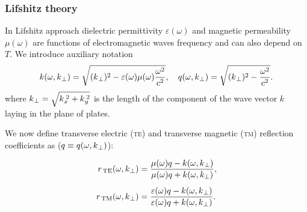 \documentclass[10pt,t]{beamer}
\begin{document}
\begin{frame}
  \frametitle{Lifshitz theory}


  In Lifshitz approach dielectric permittivity $\varepsilon( \omega )$ and magnetic
  permeability $\mu( \omega )$ are functions of electromagnetic waves frequency
  and can also depend on~$T$. We introduce auxiliary notation
  \begin{equation}
    \label{eq:First-theoretical-works-02}
    k( \omega, k_{ \hspace{0.05em} \bot } ) =
    \sqrt{ ( k_{ \hspace{0.05em} \bot } )^{ 2 } -
      \varepsilon( \omega ) \mu( \omega ) \frac{ \omega^{ 2 } }{ c^{ 2 } } }, \quad
    q( \omega, k_{ \hspace{0.05em} \bot } ) =
    \sqrt{ ( k_{ \hspace{0.05em} \bot } )^{ 2 } -
      \frac{ \omega^{ 2 } }{ c^{ 2 } } }.
  \end{equation}
  where
  $k_{ \hspace{0.05em} \bot } = \sqrt{ k_{ \hspace{0.05em} x }^{ \hspace{0.22em} 2 } +
    k_{ \hspace{0.05em} y }^{ \hspace{0.22em} 2 } }$ is the length of the component of
  the wave vector $k$ laying in the plane of plates.

  We now define transverse electric (\textsc{te}) and transverse magnetic
  (\textsc{tm}) reflection coefficients as
  ($q \equiv q( \omega, k_{ \hspace{0.05em} \bot } )$):

  \vspace{-1.5em}



  \begin{subequations}

    \begin{align}
      \label{eq:First-theoretical-works-03-A}
      r_{ \, \text{TE} }( \omega, k_{ \hspace{0.05em} \bot } )
      &=
        \frac{ \mu( \omega ) q - k( \omega, k_{ \hspace{0.05em} \bot } ) }
        { \mu( \omega ) q + k( \omega, k_{ \bot } ) }, \\[0.5em]
      \label{eq:First-theoretical-works-03-B}
      r_{ \, \text{TM} }( \omega, k_{ \hspace{0.05em} \bot } )
      &=
        \frac{ \varepsilon( \omega ) q - k( \omega, k_{ \hspace{0.05em} \bot } ) }
        { \varepsilon( \omega ) q + k( \omega, k_{ \hspace{0.05em} \bot } ) }.
    \end{align}

  \end{subequations}



\end{frame}
\end{document}
